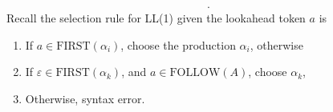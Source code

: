 \documentclass{report}
\begin{document}
\begin{itemize}
\begin{align*}
            .\end{align*}
            Recall the selection rule for LL(1) given the lookahead token $a$ is 
            \begin{enumerate}
                \item If $a \in \text{FIRST}(\alpha_{i}) $, choose the production $\alpha_{i}$, otherwise
                \item If $\varepsilon \in \text{FIRST}(\alpha_{k})$, and $a \in \text{FOLLOW}(A)$, choose $\alpha_{k}$,
                \item Otherwise, syntax error.
            \end{enumerate}







    \end{itemize}

    \pagebreak 
\end{document}
